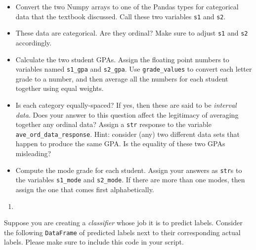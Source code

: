 \documentclass[12pt,krantz2]{krantz}
\providecommand{\tightlist}{%
  \setlength{\itemsep}{0pt}\setlength{\parskip}{0pt}}
\begin{document}
\begin{itemize}
\tightlist
\item
  Convert the two Numpy arrays to one of the Pandas types for categorical data that the textbook discussed. Call these two variables \texttt{s1} and \texttt{s2}.
\item
  These data are categorical. Are they ordinal? Make sure to adjust \texttt{s1} and \texttt{s2} accordingly.
\item
  Calculate the two student GPAs. Assign the floating point numbers to variables named \texttt{s1\_gpa} and \texttt{s2\_gpa}. Use \texttt{grade\_values} to convert each letter grade to a number, and then average all the numbers for each student together using equal weights.
\item
  Is each category equally-spaced? If yes, then these are said to be \emph{interval data}. Does your answer to this question affect the legitimacy of averaging together any ordinal data? Assign a \texttt{str} response to the variable \texttt{ave\_ord\_data\_response}. Hint: consider (any) two different data sets that happen to produce the same GPA. Is the equality of these two GPAs misleading?
\item
  Compute the mode grade for each student. Assign your answers as \texttt{str}s to the variables \texttt{s1\_mode} and \texttt{s2\_mode}. If there are more than one modes, then assign the one that comes first alphabetically.
\end{itemize}

\begin{enumerate}
\def\labelenumi{\arabic{enumi}.}
\setcounter{enumi}{1}
\item
\end{enumerate}

Suppose you are creating a \emph{classifier} whose job it is to predict labels. Consider the following \texttt{DataFrame} of predicted labels next to their corresponding actual labels. Please make sure to include this code in your script.
\end{document}

